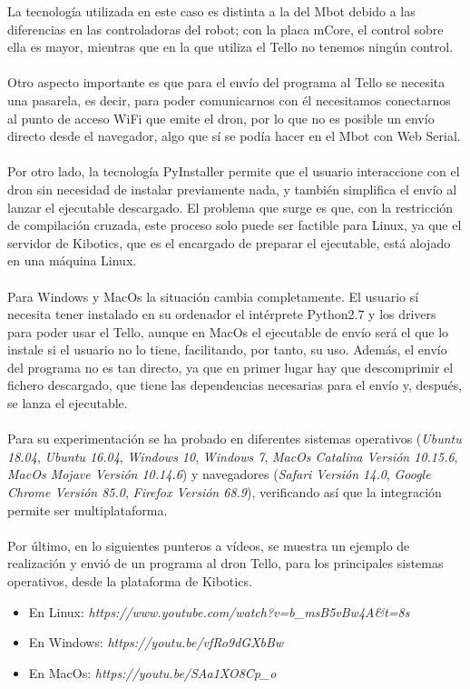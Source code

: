 \documentclass{report}
\begin{document}
La tecnología utilizada en este caso es distinta a la del Mbot debido a las diferencias en las controladoras del robot; con la placa mCore, el control sobre ella es mayor, mientras que en la que utiliza el Tello no tenemos ningún control.
\\
\\
Otro aspecto importante es que para el envío del programa al Tello se necesita una pasarela, es decir, para poder comunicarnos con él necesitamos conectarnos al punto de acceso WiFi que emite el dron, por lo que no es posible un envío directo desde el navegador, algo que sí se podía hacer en el Mbot con Web Serial.
\\
\\
Por otro lado, la tecnología PyInstaller permite que el usuario interaccione con el dron sin necesidad de instalar previamente nada, y también simplifica el envío al lanzar el ejecutable descargado. El problema que surge es que, con la restricción de compilación cruzada, este proceso solo puede ser factible para Linux, ya que el servidor de Kibotics, que es el encargado de preparar el ejecutable, está alojado en una máquina Linux.
\\
\\
Para Windows y MacOs la situación cambia completamente. El usuario sí necesita tener instalado en su ordenador el intérprete Python2.7 y los drivers para poder usar el Tello, aunque en MacOs el ejecutable de envío será el que lo instale si el usuario no lo tiene, facilitando, por tanto, su uso. Además, el envío del programa no es tan directo, ya que en primer lugar hay que descomprimir el fichero descargado, que tiene las dependencias necesarias para el envío y, después, se lanza el ejecutable.
\\ 
\\
Para su experimentación se ha probado en diferentes sistemas operativos (\textit{Ubuntu 18.04}, \textit{Ubuntu 16.04}, \textit{Windows 10}, \textit{Windows 7}, \textit{MacOs Catalina Versión 10.15.6}, \textit{MacOs Mojave Versión 10.14.6}) y navegadores (\textit{Safari Versión 14.0}, \textit{Google Chrome Versión 85.0}, \textit{Firefox Versión 68.9}), verificando así que la integración permite ser multiplataforma.
\\
\\
Por último, en lo siguientes punteros a vídeos, se muestra un ejemplo de realización y envió de un programa al dron Tello, para los principales sistemas operativos, desde la plataforma de Kibotics.
\begin{itemize}
	\item En Linux:  \textit{https://www.youtube.com/watch?v=b\_msB5vBw4A\&t=8s}
	\item En Windows:  \textit{https://youtu.be/vfRo9dGXbBw}
	\item En MacOs: \textit{https://youtu.be/SAa1XO8Cp\_o}
\end{itemize}
\end{document}
